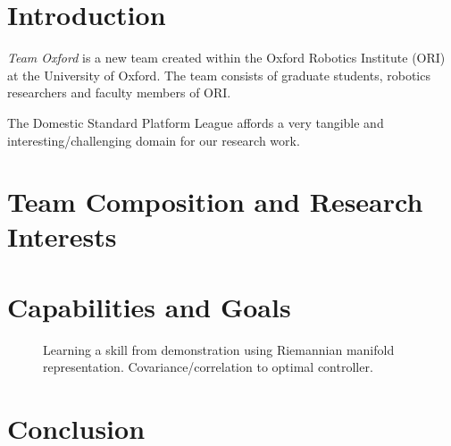 \documentclass[runningheads,a4paper]{llncs}
\begin{document}
\section{Introduction}
\textit{Team Oxford} is a new team created within the Oxford Robotics Institute
(ORI) at the University of Oxford. The team consists of graduate students,
robotics researchers and faculty members of ORI.


The Domestic Standard Platform League affords a very tangible and 
interesting/challenging domain for our research work.

\section{Team Composition and Research Interests}

\section{Capabilities and Goals}
\begin{figure}[!ht]
	\centering
	\caption{Learning a skill from demonstration using Riemannian manifold representation. Covariance/correlation to optimal controller.}
	\label{fig:baxter_water_task}
\end{figure}

\section{Conclusion}



\end{document}
